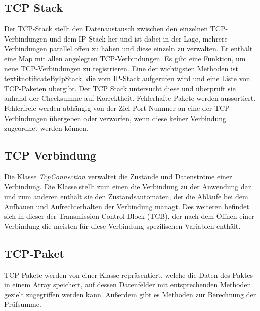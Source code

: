 \subsection{TCP Stack}
Der TCP-Stack stellt den Datenaustausch zwischen den einzelnen TCP-Verbindungen und dem IP-Stack her und ist dabei in der Lage, mehrere Verbindungen parallel offen zu haben und diese einzeln zu verwalten. 
Er enthält eine Map mit allen angelegten TCP-Verbindungen. Es gibt eine Funktion, um neue TCP-Verbindungen zu registrieren. Eine der wichtigsten Methoden ist textit{notificateByIpStack}, die vom IP-Stack aufgerufen wird und eine Liste von TCP-Paketen übergibt. Der TCP Stack untersucht diese und überprüft sie anhand der Checksumme auf Korrektheit. Fehlerhafte Pakete werden aussortiert. Fehlerfreie werden abhängig von der Ziel-Port-Nummer an eine der TCP-Verbindungen übergeben oder verworfen, wenn diese keiner Verbindung zugeordnet werden können.   

\subsection{TCP Verbindung}
Die Klasse \textit{TcpConnection} verwaltet die Zustände und Datenströme einer Verbindung. Die Klasse stellt zum einen die Verbindung zu der Anwendung dar und zum anderen enthält sie den Zustandsautomaten, der die Abläufe bei dem Aufbauen und Aufrechterhalten der Verbindung managt. Des weiteren befindet sich in dieser der Transmission-Control-Block (TCB), der nach dem Öffnen einer Verbindung die meisten für diese Verbindung spezifischen Variablen enthält.   

\subsection{TCP-Paket}
TCP-Pakete werden von einer Klasse repräsentiert, welche die Daten des Paktes in einem Array speichert, auf dessen Datenfelder mit entsprechenden Methoden gezielt zugegriffen werden kann. Außerdem gibt es Methoden zur Berechnung der Prüfsumme.


